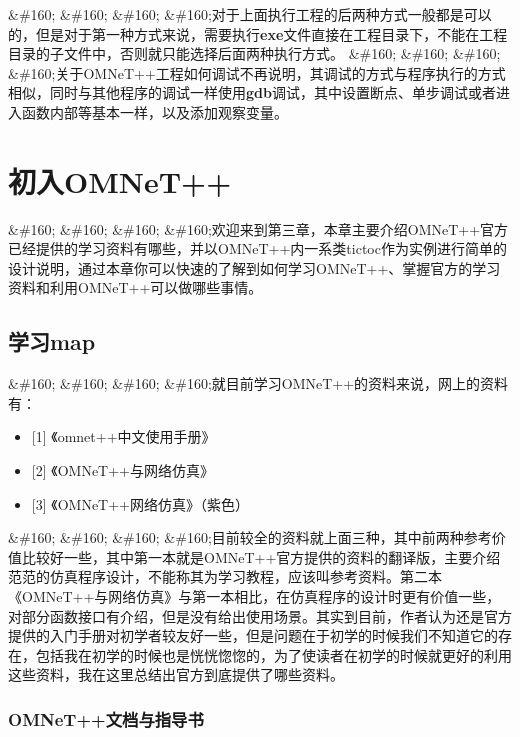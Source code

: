 \&\#160; \&\#160; \&\#160; \&\#160;对于上面执行工程的后两种方式一般都是可以的，但是对于第一种方式来说，需要执行\textbf{exe}文件直接在工程目录下，不能在工程目录的子文件中，否则就只能选择后面两种执行方式。
\&\#160; \&\#160; \&\#160; \&\#160;关于OMNeT++工程如何调试不再说明，其调试的方式与程序执行的方式相似，同时与其他程序的调试一样使用\textbf{gdb}调试，其中设置断点、单步调试或者进入函数内部等基本一样，以及添加观察变量。

\chapter{初入OMNeT++}
\label{初入omnet}

\&\#160; \&\#160; \&\#160; \&\#160;欢迎来到第三章，本章主要介绍OMNeT++官方已经提供的学习资料有哪些，并以OMNeT++内一系类tictoc作为实例进行简单的设计说明，通过本章你可以快速的了解到如何学习OMNeT++、掌握官方的学习资料和利用OMNeT++可以做哪些事情。

\section{学习map}
\label{学习map}

\&\#160; \&\#160; \&\#160; \&\#160;就目前学习OMNeT++的资料来说，网上的资料有：

\begin{itemize}
\item {[1]} 《omnet++中文使用手册》

\item {[2]} 《OMNeT++与网络仿真》

\item {[3]} 《OMNeT++网络仿真》（紫色） 

\end{itemize}

\&\#160; \&\#160; \&\#160; \&\#160;目前较全的资料就上面三种，其中前两种参考价值比较好一些，其中第一本就是OMNeT++官方提供的资料的翻译版，主要介绍范范的仿真程序设计，不能称其为学习教程，应该叫参考资料。第二本《OMNeT++与网络仿真》与第一本相比，在仿真程序的设计时更有价值一些，对部分函数接口有介绍，但是没有给出使用场景。其实到目前，作者认为还是官方提供的入门手册对初学者较友好一些，但是问题在于初学的时候我们不知道它的存在，包括我在初学的时候也是恍恍惚惚的，为了使读者在初学的时候就更好的利用这些资料，我在这里总结出官方到底提供了哪些资料。

\subsection{OMNeT++文档与指导书}
\label{omnet文档与指导书}

